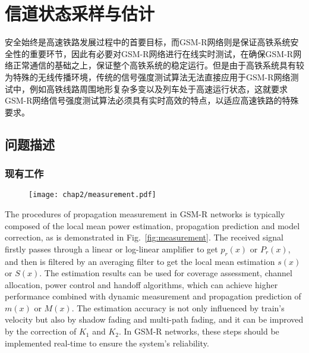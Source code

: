 

\chapter{信道状态采样与估计}
\label{chap:phy}

安全始终是高速铁路发展过程中的首要目标，而GSM-R网络则是保证高铁系统安全性的重要环节，因此有必要对GSM-R网络进行在线实时测试，在确保GSM-R网络正常通信的基础之上，保证整个高铁系统的稳定运行。但是由于高铁系统具有较为特殊的无线传播环境，传统的信号强度测试算法无法直接应用于GSM-R网络测试中，例如高铁线路周围地形复杂多变以及列车处于高速运行状态，这就要求GSM-R网络信号强度测试算法必须具有实时高效的特点，以适应高速铁路的特殊要求。

\section{问题描述}
\label{sec:problem2}

\subsection{现有工作}
\label{sec:current3}

\begin{figure}[!htp]
\centering
\texttt{[image: chap2/measurement.pdf]}
\end{figure}

The procedures of propagation measurement in GSM-R networks is typically composed of the local mean power estimation, propagation prediction and model correction, as is demonstrated in Fig.~\ref{fig:measurement}. The received signal firstly passes through a linear or log-linear amplifier to get $p_r(x)$ or $P_r(x)$, and then is filtered by an averaging filter to get the local mean estimation $s(x)$ or $S(x)$. The estimation results can be used for coverage assessment, channel allocation, power control and handoff algorithms, which can achieve higher performance combined with dynamic measurement and propagation prediction of $m(x)$ or $M(x)$. The estimation accuracy is not only influenced by train's velocity but also by shadow fading and multi-path fading, and it can be improved by the correction of $K_1$ and $K_2$. In GSM-R networks, these steps should be implemented real-time to ensure the system's reliability.

